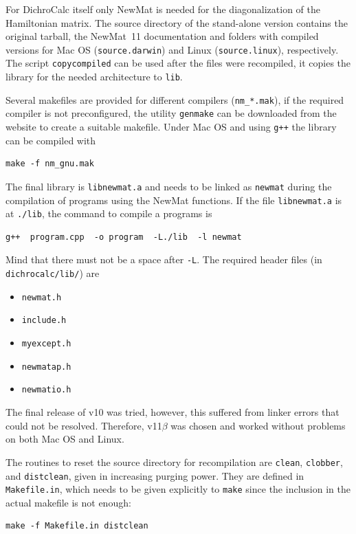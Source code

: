 \documentclass[11pt, letterpaper]{article}
\begin{document}
For DichroCalc itself only NewMat is needed for the diagonalization of the Hamiltonian matrix. The source directory of the stand-alone version contains the original tarball, the NewMat~11 documentation and folders with compiled versions for Mac OS (\verb'source.darwin') and Linux (\verb'source.linux'), respectively. The script \verb'copycompiled' can be used after the files were recompiled, it copies the library for the needed architecture to \verb'lib'.

Several makefiles are provided for different compilers (\verb'nm_*.mak'), if the required compiler is not preconfigured, the utility \verb'genmake' can be downloaded from the website to create a suitable makefile. Under Mac OS and using \verb'g++' the library can be compiled with

\begin{verbatim}
make -f nm_gnu.mak
\end{verbatim}

The final library is \verb'libnewmat.a' and needs to be linked as \verb'newmat' during the compilation of programs using the NewMat functions. If the file \verb'libnewmat.a' is at \verb'./lib', the command to compile a programs is

\begin{verbatim}
g++  program.cpp  -o program  -L./lib  -l newmat
\end{verbatim}

Mind that there must not be a space after \verb'-L'. The required header files (in \texttt{dichrocalc/lib/}) are
\begin{itemize}
\item \verb'newmat.h'
\item \verb'include.h'
\item \verb'myexcept.h'
\item \verb'newmatap.h'
\item \verb'newmatio.h'
\end{itemize}

The final release of v10 was tried, however, this suffered from linker errors that could not be resolved. Therefore, v11$\beta$ was chosen and worked without problems on both Mac OS and Linux.

The routines to reset the source directory for recompilation are \verb'clean', \verb'clobber', and \verb'distclean', given in increasing purging power. They are defined in \verb'Makefile.in', which needs to be given explicitly to \verb'make' since the inclusion in the actual makefile is not enough:
\begin{verbatim}
make -f Makefile.in distclean
\end{verbatim}
\end{document}

